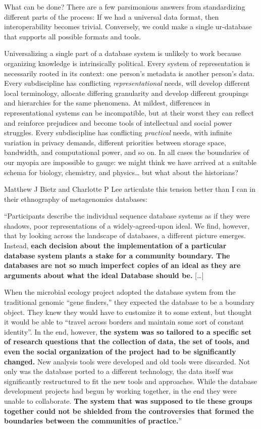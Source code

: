 \documentclass[11pt]{article}
\begin{document}
\begin{multicols}{2}
What can be done? There are a few parsimonious answers from
standardizing different parts of the process: If we had a universal data
format, then interoperability becomes trivial. Conversely, we could make
a single ur-database that supports all possible formats and tools.

Universalizing a single part of a database system is unlikely to work
because organizing knowledge is intrinsically political. Every system of
representation is necessarily rooted in its context: one person's
metadata is another person's data. Every subdiscipline has conflicting
\emph{representational} needs, will develop different local terminology,
allocate differing granularity and develop different groupings and
hierarchies for the same phenomena. At mildest, differences in
representational systems can be incompatible, but at their worst they
can reflect and reinforce prejudices and become tools of intellectual
and social power struggles. Every subdiscipline has conflicting
\emph{practical} needs, with infinite variation in privacy demands,
different priorities between storage space, bandwidth, and computational
power, and so on. In all cases the boundaries of our myopia are
impossible to gauge: we might think we have arrived at a suitable schema
for biology, chemistry, and physics\ldots{} but what about the
historians?

Matthew J Bietz and Charlotte P Lee articulate this tension better than
I can in their ethnography of metagenomics databases:

\begin{leftbar}
``Participants describe the individual sequence database systems as if
they were shadows, poor representations of a widely-agreed-upon ideal.
We find, however, that by looking across the landscape of databases, a
different picture emerges. Instead, \textbf{each decision about the
implementation of a particular database system plants a stake for a
community boundary. The databases are not so much imperfect copies of an
ideal as they are arguments about what the ideal Database should be.}
{[}\ldots{]}

When the microbial ecology project adopted the database system from the
traditional genomic ``gene finders,'' they expected the database to be a
boundary object. They knew they would have to customize it to some
extent, but thought it would be able to ``travel across borders and
maintain some sort of constant identity''. In the end, however,
\textbf{the system was so tailored to a specific set of research
questions that the collection of data, the set of tools, and even the
social organization of the project had to be significantly changed.} New
analysis tools were developed and old tools were discarded. Not only was
the database ported to a different technology, the data itself was
significantly restructured to fit the new tools and approaches. While
the database development projects had begun by working together, in the
end they were unable to collaborate. \textbf{The system that was
supposed to tie these groups together could not be shielded from the
controversies that formed the boundaries between the communities of
practice.}'' \cite{bietzCollaborationMetagenomicsSequence2009} 
\end{leftbar}


\end{multicols}
\end{document}
